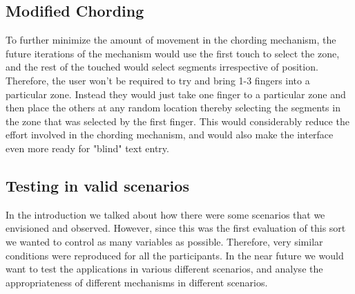 \subsection{Modified Chording}

To further minimize the amount of movement in the chording mechanism,
the future iterations of the mechanism would use the first touch to
select the zone, and the rest of the touched would select segments
irrespective of position. Therefore, the user won't be required to try
and bring 1-3 fingers into a particular zone. Instead they would just
take one finger to a particular zone and then place the others at any
random location thereby selecting the segments in the zone that was
selected by the first finger. This would considerably reduce the
effort involved in the chording mechanism, and would also make the
interface even more ready for "blind" text entry.

\subsection{Testing in valid scenarios}

In the introduction we talked about how there were some scenarios that we
envisioned and observed. However, since this was the first
evaluation of this sort we wanted to control as many variables as
possible. Therefore, very similar conditions were reproduced for all
the participants. In the near future we would want to test the
applications in various different scenarios, and analyse the appropriateness of different mechanisms in different scenarios.
